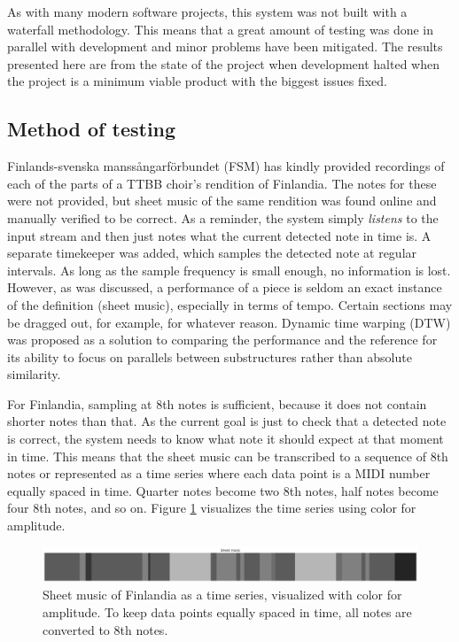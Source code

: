 As with many modern software projects, this system was not built with a waterfall methodology. This means that a great amount of testing was done in parallel with development and minor problems have been mitigated. The results presented here are from the state of the project when development halted when the project is a minimum viable product with the biggest issues fixed.

\subsection{Method of testing}
Finlands-svenska manssångarförbundet (FSM) has kindly provided recordings of each of the parts of a TTBB choir's rendition of Finlandia. The notes for these were not provided, but sheet music of the same rendition was found online and manually verified to be correct. As a reminder, the system simply \textit{listens} to the input stream and then just notes what the current detected note in time is. A separate timekeeper was added, which samples the detected note at regular intervals. As long as the sample frequency is small enough, no information is lost. However, as was discussed, a performance of a piece is seldom an exact instance of the definition (sheet music), especially in terms of tempo. Certain sections may be dragged out, for example, for whatever reason. Dynamic time warping (DTW) was proposed as a solution to comparing the performance and the reference for its ability to focus on parallels between substructures rather than absolute similarity.

For Finlandia, sampling at 8th notes is sufficient, because it does not contain shorter notes than that. As the current goal is just to check that a detected note is correct, the system needs to know what note it should expect at that moment in time. This means that the sheet music can be transcribed to a sequence of 8th notes or represented as a time series where each data point is a MIDI number equally spaced in time. Quarter notes become two 8th notes, half notes become four 8th notes, and so on. Figure \ref{fig:sheetEncoding} visualizes the time series using color for amplitude.

\begin{figure}[ht]
    \centering
    \includegraphics[width=\textwidth]{./images/sheetEncoding.png}
    \caption{Sheet music of Finlandia as a time series, visualized with color for amplitude. To keep data points equally spaced in time, all notes are converted to 8th notes. \label{fig:sheetEncoding}}
\end{figure}


